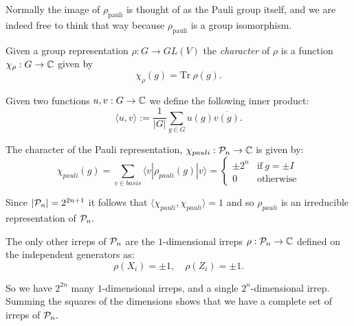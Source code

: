 
Normally the image of 
$\rho_{\mathrm{pauli}}$ is thought of as the
Pauli group itself, and we are indeed free to think
that way because $\rho_{\mathrm{pauli}}$ is a group
isomorphism.

Given a group representation $\rho:G\to GL(V)$
the {\it character} of $\rho$ is a function
$\chi_\rho:G\to \mathbb{C}$ given by
$$
    \chi_\rho(g) = \mbox{Tr}\ \rho(g).
$$

Given two functions $u,v : G \to \mathbb{C}$ 
we define the following inner product:
$$
    \langle u, v \rangle := \frac{1}{|G|} \sum_{g\in G} u(g) \overline{v(g)}.
$$

The character of the Pauli representation, $\chi_{{pauli}}:\mathcal{P}_n\to\mathbb{C}$
is given by:
$$
\chi_{{pauli}}(g) = \sum_{v \in basis} \langle v | \rho_{{pauli}}(g) | v \rangle
    = \left\{ \begin{array}{ll}
 \pm 2^n &\mbox{if}\ g=\pm I\\
 0 &\mbox{otherwise}\end{array}\right.
$$

Since $|\mathcal{P}_n|=2^{2n+1}$ it follows that
$\langle\chi_{pauli},\chi_{pauli}\rangle = 1$ and
so $\rho_{pauli}$ is an irreducible representation of $\mathcal{P}_n.$

The only other irreps of $\mathcal{P}_n$ are 
the $1$-dimensional irreps $\rho:\mathcal{P}_n\to\mathbb{C}$
defined on the independent generators as:
    $$ \rho(X_i) = \pm 1,\quad \rho(Z_i) = \pm 1.$$

So we have $2^{2n}$ many $1$-dimensional irreps,
and a single $2^n$-dimensional irrep.
Summing the squares of the dimensions
shows that we have a complete set of irreps of $\mathcal{P}_n.$

%


